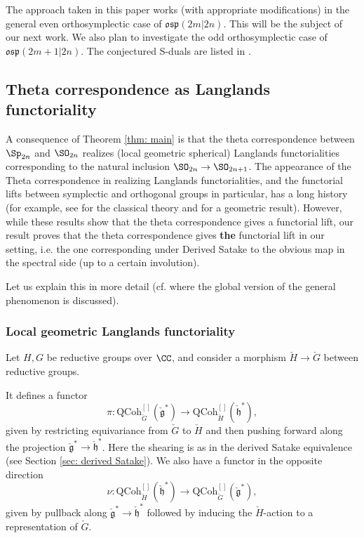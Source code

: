 \documentclass[11pt]{article}
\begin{document}
The approach taken in this paper works (with appropriate modifications) in the general even orthosymplectic case of $\mathfrak{osp}(2m|2n)$. This will be the subject of our next work. We also plan to investigate the odd orthosymplectic case of $\mathfrak{osp}(2m+1|2n)$. The conjectured S-duals are listed in \cite[Table 1]{FiU}.
\subsection{Theta correspondence as Langlands functoriality}\label{sec: functoriality}
A consequence of Theorem \ref{thm: main} is that the theta correspondence between $\Sp_{2n}$ and $\SO_{2n}$ realizes (local geometric spherical) Langlands functorialities corresponding to the natural inclusion $\SO_{2n}\to \SO_{2n+1}$.
The appearance of the Theta correspondence in realizing Langlands functorialities, and the functorial lifts between symplectic and orthogonal groups in particular, has a long history (for example, see \cite[§6]{Ral} for the classical theory and \cite{Lys} for a geometric result).
However, while these results show that the theta correspondence gives a functorial lift, our result proves that the theta correspondence gives {\bf the} functorial lift in our setting, i.e. the one corresponding under Derived Satake to the obvious map in the spectral side (up to a certain involution).

Let us explain this in more detail (cf. \cite[§12.3]{BZSV} where the global version of the general phenomenon is discussed).
\subsubsection{Local geometric Langlands functoriality}
Let $H,G$ be reductive groups over $\CC$, and consider a morphism $\check{H}\to \check{G}$ between reductive groups.

It defines a functor $$\pi: \mathrm{QCoh}_{\check{G}}^{[]}(\mathfrak{\check{g}}^*)\to \mathrm{QCoh}_{\check{H}}^{[]}(\mathfrak{\check{h}}^*),$$
given by restricting equivariance from $\check{G}$ to $\check{H}$ and then pushing forward along the projection $\mathfrak{\check{g}}^*\to \mathfrak{\check{h}}^*$.
Here the shearing is as in the derived Satake equivalence (see Section \ref{sec: derived Satake}).
We also have a functor in the opposite direction $$\nu: \mathrm{QCoh}_{\check{H}}^{[]}(\mathfrak{\check{h}}^*)\to \mathrm{QCoh}_{\check{G}}^{[]}(\mathfrak{\check{g}}^*),$$
given by pullback along $\check{\mathfrak{g}}^*\to \check{\mathfrak{h}}^*$ followed by inducing the $\check{H}$-action to a representation of $\check{G}$.
\end{document}
